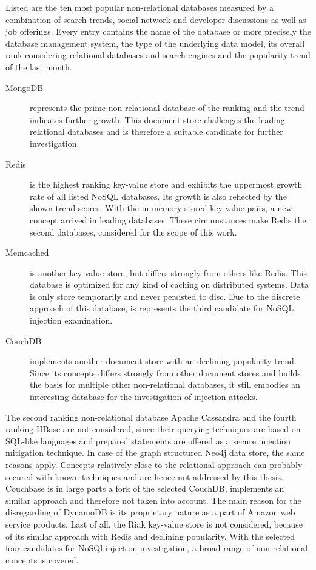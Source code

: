 Listed are the ten most popular non-relational databases measured by a combination of search trends, social network and developer discussions as well as job offerings. Every entry contains the name of the database or more precisely the database management system, the type of the underlying data model, its overall rank considering relational databases and search engines and the popularity trend of the last month. 




\begin{description}
\item [MongoDB] represents the prime non-relational database of the ranking and the trend indicates further growth. This document store challenges the leading relational databases and is therefore a suitable candidate for further investigation. 
\item [Redis] is the highest ranking key-value store and exhibits the uppermost growth rate of all listed NoSQL databases. Its growth is also reflected by the shown trend scores. With the in-memory stored key-value pairs, a new concept arrived in leading databases. These circumstances make Redis the second databases, considered for the scope of this work.
\item [Memcached] is another key-value store, but differs strongly from others like Redis. This database is optimized for any kind of caching on distributed systems. Data is only store temporarily and never persisted to disc. Due to the discrete approach of this database, is represents the third candidate for NoSQL injection examination.
\item [CouchDB] implements another document-store with an declining popularity trend. Since its concepts differs strongly from other document stores and builds the basis for multiple other non-relational databases, it still embodies an interesting database for the investigation of injection attacks.
\end{description}

The second ranking non-relational database Apache Cassandra and the fourth ranking HBase are not considered, since their querying techniques are based on SQL-like languages and prepared statements are offered as a secure injection mitigation technique. In case of the graph structured Neo4j data store, the same reasons apply. Concepts relatively close to the relational approach can probably secured with known techniques and are hence not addressed by this thesis. Couchbase is in large parts a fork of the selected CouchDB, implements an similar approach and therefore not taken into account. The main reason for the disregarding of DynamoDB is its proprietary nature as a part of Amazon web service products. Last of all, the Riak key-value store is not considered, because of its similar approach with Redis and declining popularity. With the selected four candidates for NoSQl injection investigation, a broad range of non-relational concepts is covered.


